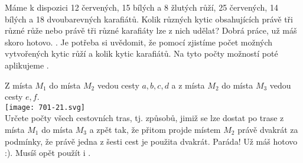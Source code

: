 \documentclass[language = czech]{webquiz}
\begin{document}
	\begin{question} \label{o7} %
		Máme k dispozici 12 červených, 15 bílých a 8 žlutých růží, 25 červených, 14 bílých a 18 dvoubarevných karafiátů. Kolik různých kytic obsahujících právě tři různé růže nebo právě tři různé karafiáty lze z nich udělat?
		\whenRight Dobrá práce, už máš skoro hotovo. .
		\whenWrong Je potřeba si uvědomit, že pomocí  zjistíme počet možných vytvořených kytic růží a kolik kytic karafiátů. Na tyto počty možností poté aplikujeme . 
	\end{question}
	
	\begin{question} \label{o8} %
		Z místa $M_1$ do místa $M_2$ vedou cesty $a, b, c, d$ a z místa $M_2$ do místa $M_3$ vedou cesty $e, f$.\\
		\texttt{[image: 701-21.svg]}\\
		 Určete počty všech cestovních tras, tj. způsobů, jimiž se lze dostat po trase z místa $M_1$ do místa $M_3$ a zpět tak, že přitom projde místem $M_2$ právě dvakrát za podmínky, že právě jedna z šesti cest je použita dvakrát.
		\whenRight Paráda! Už máš hotovo :).
		\whenWrong Musíš opět použít  i .
	\end{question}
	
\end{document}
